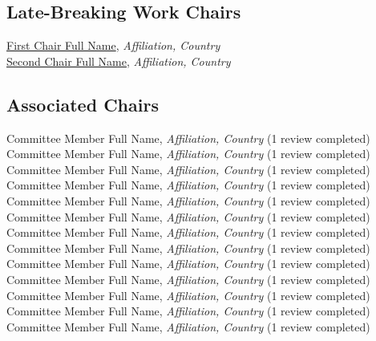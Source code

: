 
\subsection{Late-Breaking Work Chairs}
\href{https://orcid.org/0000-0001-2345-6789}{First Chair Full Name}, \emph{Affiliation, Country}\\
\href{https://orcid.org/0000-0001-2345-6789}{Second Chair Full Name}, \emph{Affiliation, Country}\\


\subsection{Associated Chairs}
Committee Member Full Name, \emph{Affiliation, Country} (1 review completed)\\
Committee Member Full Name, \emph{Affiliation, Country} (1 review completed)\\
Committee Member Full Name, \emph{Affiliation, Country} (1 review completed)\\
Committee Member Full Name, \emph{Affiliation, Country} (1 review completed)\\
Committee Member Full Name, \emph{Affiliation, Country} (1 review completed)\\
Committee Member Full Name, \emph{Affiliation, Country} (1 review completed)\\
Committee Member Full Name, \emph{Affiliation, Country} (1 review completed)\\
Committee Member Full Name, \emph{Affiliation, Country} (1 review completed)\\
Committee Member Full Name, \emph{Affiliation, Country} (1 review completed)\\
Committee Member Full Name, \emph{Affiliation, Country} (1 review completed)\\
Committee Member Full Name, \emph{Affiliation, Country} (1 review completed)\\
Committee Member Full Name, \emph{Affiliation, Country} (1 review completed)\\
Committee Member Full Name, \emph{Affiliation, Country} (1 review completed)\\

